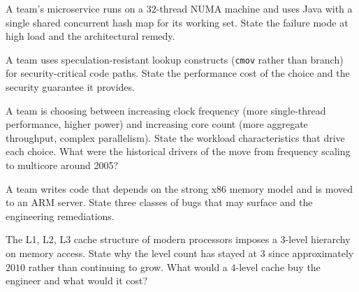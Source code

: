 \begin{exercise}
A team's microservice runs on a $32$-thread NUMA machine and uses Java with a single shared concurrent hash map for its working set. State the failure mode at high load and the architectural remedy.
\end{exercise}

\begin{exercise}
A team uses speculation-resistant lookup constructs (\texttt{cmov} rather than branch) for security-critical code paths. State the performance cost of the choice and the security guarantee it provides.
\end{exercise}

\begin{exercise}
A team is choosing between increasing clock frequency (more single-thread performance, higher power) and increasing core count (more aggregate throughput, complex parallelism). State the workload characteristics that drive each choice. What were the historical drivers of the move from frequency scaling to multicore around 2005?
\end{exercise}

\begin{exercise}
A team writes code that depends on the strong x86 memory model and is moved to an ARM server. State three classes of bugs that may surface and the engineering remediations.
\end{exercise}

\begin{exercise}
The L1, L2, L3 cache structure of modern processors imposes a $3$-level hierarchy on memory access. State why the level count has stayed at $3$ since approximately $2010$ rather than continuing to grow. What would a $4$-level cache buy the engineer and what would it cost?
\end{exercise}
